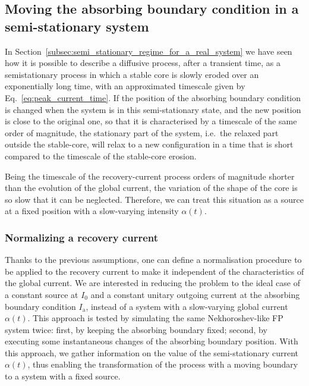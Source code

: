 {%

\subsection{Moving the absorbing boundary condition in a semi-stationary system}
\label{subsec:Moving_the_boundary_in_a_semi_stationary_system}


In Section~\ref{subsec:semi_stationary_regime_for_a_real_system} we have seen how it is possible to describe a diffusive process, after a transient time, as a semistationary process in which a stable core is slowly eroded over an exponentially long time, with an approximated timescale given by Eq.~\eqref{eq:peak_current_time}. If the position of the absorbing boundary condition is changed when the system is in this semi-stationary state, and the new position is close to the original one, so that it is characterised by a timescale of the same order of magnitude, the stationary part of the system, i.e.\ the relaxed part outside the stable-core, will relax to a new configuration in a time that is short compared to the timescale of the stable-core erosion.

Being the timescale of the recovery-current process orders of magnitude shorter than the evolution of the global current, the variation of the shape of the core is so slow that it can be neglected. Therefore, we can treat this situation as a source at a fixed position with a slow-varying intensity $\alpha(t)$. 


\subsubsection{Normalizing a recovery current}


Thanks to the previous assumptions, one can define a normalisation procedure to be applied to the recovery current to make it independent of the characteristics of the global current. We are interested in reducing the problem to the ideal case of a constant source at $I_0$ and a constant unitary outgoing current at the absorbing boundary condition $I_\mathrm{a}$, instead of a system with a slow-varying global current $\alpha(t)$. This approach is tested by simulating the same Nekhoroshev-like FP system twice: first, by keeping the absorbing boundary fixed; second, by executing some instantaneous changes of the absorbing boundary position. With this approach, we gather information on the value of the semi-stationary current $\alpha(t)$, thus enabling the transformation of the process with a moving boundary to a system with a fixed source.

}

